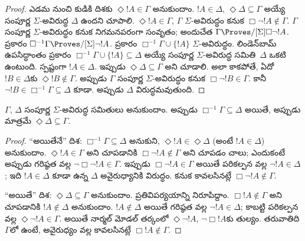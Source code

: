 \documentclass[../../../include/open-logic-section]{subfiles}
\begin{document}
{\begin{proof}
  ఎడమ నుంచి కుడికి దిశకు $\Diamond !A \in \Gamma$
  అనుకుందాం. $!A \in \Delta$, $\Diamond\Delta \subseteq
  \Gamma$ అయ్యే సంపూర్ణ $\Sigma$-అవిరుద్ధ $\Delta$ ఉందని
  చూపాలి. $\Diamond !A \in \Gamma$, $\Gamma$
  $\Sigma$-అవిరుద్ధం కనుక $\Box\lnot !A \notin \Gamma$.
  $\Gamma$ సంపూర్ణ $\Sigma$-అవిరుద్ధం కనుక నిగమనపరంగా
  సంవృతం; అందుచేత $\Gamma \Proves/[\Sigma] \Box\lnot !A$.
   ప్రకారం $\Box^{-1}\Gamma
  \Proves/[\Sigma] \lnot !A$.
  ప్రకారం $\Box^{-1}\Gamma \cup \{ !A \}$
  $\Sigma$-అవిరుద్ధం. లిండెన్‌బామ్ ఉపసిద్ధాంతం ప్రకారం
  $\Box^{-1}\Gamma \cup \{ !A \} \subseteq \Delta$
  అయ్యే సంపూర్ణ $\Sigma$-అవిరుద్ధ సమితి~$\Delta$ ఒకటి
  ఉంటుంది. స్పష్టంగా $!A \in \Delta$. ఇప్పుడు
  $\Diamond\Delta \subseteq \Gamma$ అని చూడాలి. అలా
  కాకపోతే, ఏదో $!B \in \Delta$కు $\Diamond !B \notin
  \Gamma$. అప్పుడు $\Gamma$ సంపూర్ణ $\Sigma$-అవిరుద్ధం
  కనుక $\Box\lnot !B \in \Gamma$. కానీ $\lnot !B \in
  \Box^{-1}\Gamma \subseteq \Delta$ కూడా. అప్పుడు $\Delta$
  విరుద్ధమవుతుంది.
\end{proof}
}

\begin{lem}
  $\Gamma$, $\Delta$ సంపూర్ణ $\Sigma$-అవిరుద్ధ సమితులు
  అనుకుందాం. అప్పుడు $\Box^{-1}\Gamma \subseteq \Delta$
  అయితే, అప్పుడు మాత్రమే $\Diamond\Delta \subseteq \Gamma$.
\end{lem}

\begin{proof}
  ``అయితేనే'' దిశ: $\Box^{-1}\Gamma \subseteq \Delta$
  అనుకుని, $\Diamond!A \in \Diamond\Delta$ (అంటే $!A \in
  \Delta$) అనుకుందాం. $\Diamond!A \in \Gamma$ అని చూపడానికి
  $\Box\lnot!A \notin \Gamma$ అని చూపడం చాలు; ఎందుకంటే అప్పుడు
  గరిష్ఠత వల్ల $\lnot\Box\lnot !A \in \Gamma$. ఇప్పుడు
  $\Box\lnot!A \in \Gamma$ అయితే పరికల్పన వల్ల $\lnot!A
  \in \Delta$; ఇది $!A \in \Delta$ కూడా ఉన్న $\Delta$
  అవైరుధ్యానికి విరుద్ధం. కనుక కావలసినట్లే $\Box\lnot!A
  \notin \Gamma$.

  ``అయితే'' దిశ: $\Diamond\Delta \subseteq \Gamma$
  అనుకుందాం. ప్రతివిపర్యయాన్ని నిరూపిద్దాం. $\Box!A \notin \Gamma$
  అని చూపడానికి $!A \notin \Delta$ అనుకుందాం.
  $!A \notin \Delta$ అయితే గరిష్ఠత వల్ల $\lnot!A \in
  \Delta$; కాబట్టి పరికల్పన వల్ల $\Diamond\lnot!A \in \Gamma$.
  అయితే నార్మల్ మోడల్ తర్కంలో $\Diamond\lnot!A$,
  $\lnot\Box !A$కు తుల్యం. తరువాతిది $\Gamma$లో ఉంటే,
  అవైరుధ్యం వల్ల కావలసినట్లే $\Box!A \notin\Gamma$.
\end{proof}
\end{document}
